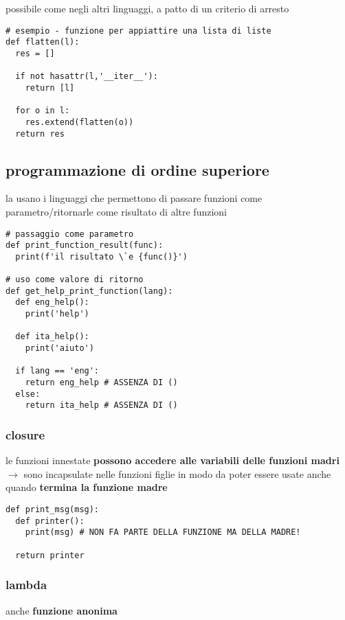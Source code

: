 possibile come negli altri linguaggi, a patto di un criterio di arresto

\begin{verbatim}
# esempio - funzione per appiattire una lista di liste
def flatten(l):
  res = []
  
  if not hasattr(l,'__iter__'):
    return [l]
  
  for o in l:
    res.extend(flatten(o))
  return res
\end{verbatim}

\subsection{programmazione di ordine superiore}

la usano i linguaggi che permettono di passare funzioni come parametro/ritornarle come risultato di altre funzioni

\begin{verbatim}
# passaggio come parametro
def print_function_result(func):
  print(f'il risultato \`e {func()}')

# uso come valore di ritorno
def get_help_print_function(lang):
  def eng_help():
    print('help')
    
  def ita_help():
    print('aiuto')
    
  if lang == 'eng':
    return eng_help # ASSENZA DI ()
  else:
    return ita_help # ASSENZA DI ()
\end{verbatim}

\subsubsection{closure}

le funzioni innestate \textbf{possono accedere alle variabili delle funzioni madri} $\rightarrow$ sono incapsulate nelle funzioni figlie in modo da poter essere usate anche quando \textbf{termina la funzione madre}

\begin{verbatim}
def print_msg(msg):
  def printer():
    print(msg) # NON FA PARTE DELLA FUNZIONE MA DELLA MADRE!
  
  return printer
\end{verbatim}

\subsubsection{lambda}

anche \textbf{funzione anonima}

